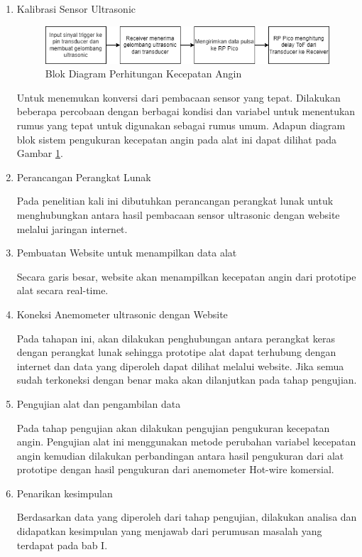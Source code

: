 \begin{enumerate}
  \item Kalibrasi Sensor Ultrasonic

\begin{figure}[h!]
	\centering
	\includegraphics[width=0.7\linewidth]{"gambar/Diagram blok pengukuran kecepatan angin.drawio"}
	\caption{Blok Diagram Perhitungan Kecepatan Angin}
	\label{fig:diagram-blok-pengukuran-kecepatan-angin}
\end{figure}

  Untuk menemukan konversi dari pembacaan sensor yang tepat. Dilakukan beberapa percobaan dengan berbagai kondisi dan variabel untuk menentukan rumus yang tepat untuk digunakan sebagai rumus umum.
  Adapun diagram blok sistem pengukuran kecepatan angin pada alat ini dapat dilihat pada Gambar \ref{fig:diagram-blok-pengukuran-kecepatan-angin}.

  \item Perancangan Perangkat Lunak
  
  Pada penelitian kali ini dibutuhkan perancangan perangkat lunak untuk menghubungkan antara hasil pembacaan sensor ultrasonic dengan website melalui jaringan internet.

  \item Pembuatan Website untuk menampilkan data alat
  
  Secara garis besar, website akan menampilkan kecepatan angin dari prototipe alat secara real-time.
  
  \item Koneksi Anemometer ultrasonic dengan Website
  
  Pada tahapan ini, akan dilakukan penghubungan antara perangkat keras dengan perangkat lunak sehingga prototipe alat dapat terhubung dengan internet dan data yang diperoleh dapat dilihat melalui 
  website. Jika semua sudah terkoneksi dengan benar maka akan dilanjutkan pada tahap pengujian.

  \item Pengujian alat dan pengambilan data
  
  Pada tahap pengujian akan dilakukan pengujian pengukuran kecepatan angin. Pengujian alat ini menggunakan metode perubahan variabel kecepatan angin kemudian dilakukan perbandingan 
  antara hasil pengukuran dari alat prototipe dengan hasil pengukuran dari anemometer Hot-wire komersial.
  \item Penarikan kesimpulan
  
  Berdasarkan data yang diperoleh dari tahap pengujian, dilakukan analisa dan didapatkan kesimpulan yang menjawab dari perumusan masalah yang terdapat pada bab I. 
\end{enumerate}

